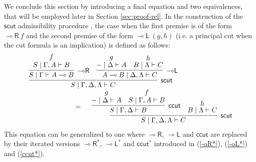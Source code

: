 \documentclass[sn-mathphys-num]{sn-jnl}%
\newcommand{\GG}{\Gamma}
\newcommand{\GD}{\Delta}
\newcommand{\GL}{\Lambda}
\newcommand{\vd}{\vdash}
\newcommand{\lolli}{\multimap}
\newcommand{\lleft}{{\lolli}\mathsf{L}}
\newcommand{\lright}{{\lolli}\mathsf{R}}
\newcommand{\proofbox}[1]{\begin{tabular}{l} #1 \end{tabular}}
\theoremstyle{thmstyleone}%
\theoremstyle{thmstyletwo}%
\theoremstyle{thmstylethree}%
\begin{document}
We conclude this section by introducing a final equation and two equivalences, that will be employed later in Section \ref{sec:proof-rel}.
In the construction of the $\mathsf{scut}$ admissibility procedure \cite{UVW:protsn,wan2024}, the case when the first premise is of the form $\lright\ f$ and the second premise of the form $\lleft\ (g,h)$ (i.e. a principal cut when the cut formula is an implication) is defined as follows:
\[
\begin{array}{l}
  \proofbox{
  \infer[\mathsf{scut}]{S \mid \GG,\GD,\GL \vd C}{
  \infer[\lright]{S \mid \GG \vd A \lolli B}{
  \deduce{S \mid \GG, A \vd B}{f}
  }
  &
  \infer[\lleft]{A \lolli B \mid \GD,\GL \vd C}{
  \deduce{{-} \mid \GD \vd A}{g}
  &
  \deduce{B \mid \GL \vd C}{h}
  }
  }
  }\\
  \qquad\qquad \qquad\qquad =
  \proofbox{
  \infer[\mathsf{scut}]{S \mid \GG,\GD,\GL \vd C}{
  \infer[\mathsf{ccut}]{S \mid \GG, \GD \vd B}{
  \deduce{{-} \mid \GD \vd A}{g}
  &
  \deduce{S \mid \GG, A \vd B}{f}
  }
  &
  \deduce{B \mid \GL \vd C}{h}
  }
  }
\end{array}
\]
This equation can be generalized to one where $\lright$, $\lleft$ and $\mathsf{ccut}$ are replaced by their iterated versions $\lright^*$, $\lleft^*$ and $\mathsf{ccut^*}$ introduced in (\ref{-oR*}), (\ref{-oL*}) and (\ref{ccut*}). 
\end{document}
